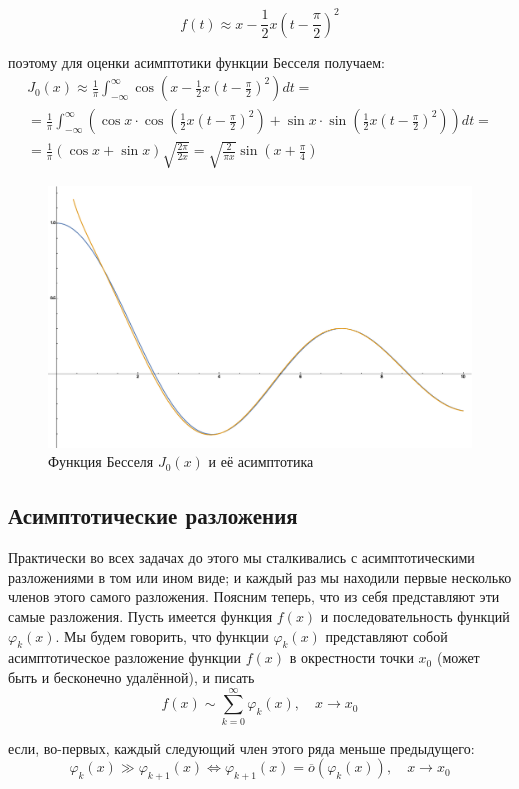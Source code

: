 \documentclass[a4paper,12pt]{article}
\begin{document}
\[
f(t)\approx x-\frac{1}{2}x\left(t-\frac{\pi}{2}\right)^{2}
\]

\noindent
поэтому для оценки асимптотики функции Бесселя получаем:
\begin{multline*}
J_{0}(x)\approx\frac{1}{\pi}\int_{-\infty}^{\infty}\cos\left(x-\frac{1}{2}x\left(t-\frac{\pi}{2}\right)^{2}\right)dt=\\
=\frac{1}{\pi}\int_{-\infty}^{\infty}\left(\cos x\cdot\cos\left(\frac{1}{2}x\left(t-\frac{\pi}{2}\right)^{2}\right)+\sin x\cdot\sin\left(\frac{1}{2}x\left(t-\frac{\pi}{2}\right)^{2}\right)\right)dt=\\
=\frac{1}{\pi}(\cos x+\sin x)\sqrt{\frac{2\pi}{2x}}=\sqrt{\frac{2}{\pi x}}\sin\left(x+\frac{\pi}{4}\right)
\end{multline*}


\begin{figure}[h]
\caption{Функция Бесселя $J_{0}(x)$ и её асимптотика}
\centering
\includegraphics[width=0.65\columnwidth]{besselj.eps}
\end{figure}


\subsection*{Асимптотические разложения}

Практически во всех задачах до этого мы сталкивались с асимптотическими разложениями
в том или ином виде; и каждый раз мы находили первые несколько членов
этого самого разложения. Поясним теперь, что из себя представляют
эти самые разложения. Пусть имеется функция $f(x)$ и последовательность
функций $\varphi_{k}(x)$. Мы будем говорить, что функции $\varphi_{k}(x)$
представляют собой асимптотическое разложение функции $f(x)$ в окрестности
точки $x_{0}$ (может быть и бесконечно удалённой), и писать
\[
f(x)\sim\sum_{k=0}^{\infty}\varphi_{k}(x),\quad x\to x_{0}
\]

\noindent
если, во-первых, каждый следующий член этого ряда меньше предыдущего:
\[
\varphi_{k}(x)\gg\varphi_{k+1}(x)\Leftrightarrow\varphi_{k+1}(x)=\overline{o}(\varphi_{k}(x)),\quad x\to x_{0}
\]
\end{document}
